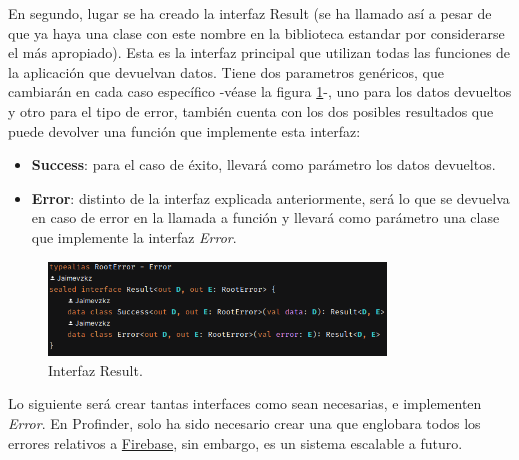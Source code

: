 En segundo, lugar se ha creado la interfaz Result (se ha llamado así a pesar de que ya haya una clase con este nombre en la biblioteca estandar por considerarse el más apropiado). Esta es la interfaz principal que utilizan todas las funciones de la aplicación que devuelvan datos. Tiene dos parametros genéricos, que cambiarán en cada caso específico -véase la figura \ref{fig:ejemplo_result}-, uno para los datos devueltos y otro para el tipo de error, también cuenta con los dos posibles resultados que puede devolver una función que implemente esta interfaz: 
\begin{itemize}
    \item \textbf{Success}: para el caso de éxito, llevará como parámetro los datos devueltos.
    \item \textbf{Error}: distinto de la interfaz explicada anteriormente, será lo que se devuelva en caso de error en la llamada a función y llevará como parámetro una clase que implemente la interfaz \textit{Error}.
\end{itemize}
\begin{figure}[h]
    \centering
    \includegraphics[width = 0.8\textwidth]{Imagenes/Fuentes/ejemplo_result.png}
    \caption{Interfaz Result.}
    \label{fig:ejemplo_result}
\end{figure}

Lo siguiente será crear tantas interfaces como sean necesarias, e implementen \textit{Error}. En Profinder, solo ha sido necesario crear una que englobara todos los errores relativos a \hyperlink{subsec:firebase}{Firebase}, sin embargo, es un sistema escalable a futuro.

